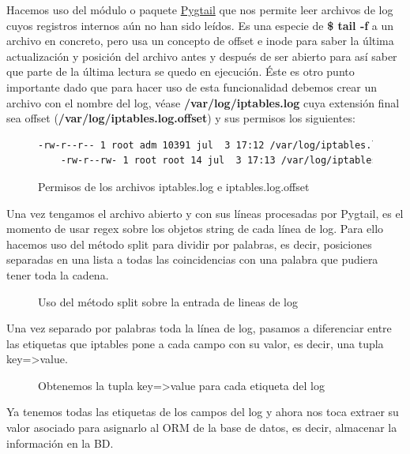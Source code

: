 Hacemos uso del módulo o paquete \href{https://pypi.python.org/pypi/pygtail}{Pygtail} que nos permite leer archivos de log cuyos registros internos aún no han sido leídos. Es una especie de \textbf{\$ tail -f} a un archivo en concreto, pero usa un concepto de offset e inode para saber la última actualización y posición del archivo antes y después de ser abierto para así saber que parte de la última lectura se quedo en ejecución. Éste es otro punto importante dado que para hacer uso de esta funcionalidad debemos crear un archivo con el nombre del log, véase \textbf{/var/log/iptables.log} cuya extensión final sea offset (\textbf{/var/log/iptables.log.offset}) y sus permisos los siguientes:

\begin{figure}[H]
  \begin{lstlisting}[language=bash, breaklines=true]
    -rw-r--r-- 1 root adm 10391 jul  3 17:12 /var/log/iptables.log
    -rw-r--rw- 1 root root 14 jul  3 17:13 /var/log/iptables.log.offset
  \end{lstlisting}
  \caption{Permisos de los archivos iptables.log e iptables.log.offset}
\end{figure}

Una vez tengamos el archivo abierto y con sus líneas procesadas por Pygtail, es el momento de usar regex sobre los objetos string de cada línea de log. Para ello hacemos uso del método split para dividir por palabras, es decir, posiciones separadas en una lista a todas las coincidencias con una palabra que pudiera tener toda la cadena.\\

\begin{figure}[H]

\caption{Uso del método split sobre la entrada de lineas de log}
\end{figure}

Una vez separado por palabras toda la línea de log, pasamos a diferenciar entre las etiquetas que iptables pone a cada campo con su valor, es decir, una tupla key=>value. \\

\begin{figure}[H]

\caption{Obtenemos la tupla key=>value para cada etiqueta del log}
\end{figure}

Ya tenemos todas las etiquetas de los campos del log y ahora nos toca extraer su valor asociado para asignarlo al ORM de la base de datos, es decir, almacenar la información en la BD.\\


